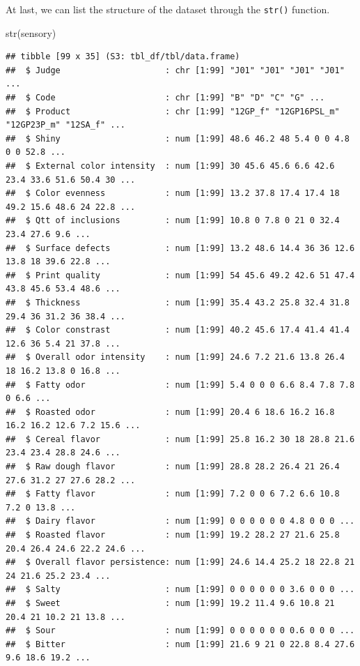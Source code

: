\documentclass[
]{book}
\newenvironment{Shaded}{\begin{snugshade}}{\end{snugshade}}
\newcommand{\FunctionTok}[1]{\textcolor[rgb]{0.00,0.00,0.00}{#1}}
\newcommand{\NormalTok}[1]{#1}
\begin{document}
At last, we can list the structure of the dataset through the \texttt{str()} function.

\begin{Shaded}
\begin{Highlighting}[]
\FunctionTok{str}\NormalTok{(sensory)}
\end{Highlighting}
\end{Shaded}

\begin{verbatim}
## tibble [99 x 35] (S3: tbl_df/tbl/data.frame)
##  $ Judge                     : chr [1:99] "J01" "J01" "J01" "J01" ...
##  $ Code                      : chr [1:99] "B" "D" "C" "G" ...
##  $ Product                   : chr [1:99] "12GP_f" "12GP16PSL_m" "12GP23P_m" "12SA_f" ...
##  $ Shiny                     : num [1:99] 48.6 46.2 48 5.4 0 0 4.8 0 0 52.8 ...
##  $ External color intensity  : num [1:99] 30 45.6 45.6 6.6 42.6 23.4 33.6 51.6 50.4 30 ...
##  $ Color evenness            : num [1:99] 13.2 37.8 17.4 17.4 18 49.2 15.6 48.6 24 22.8 ...
##  $ Qtt of inclusions         : num [1:99] 10.8 0 7.8 0 21 0 32.4 23.4 27.6 9.6 ...
##  $ Surface defects           : num [1:99] 13.2 48.6 14.4 36 36 12.6 13.8 18 39.6 22.8 ...
##  $ Print quality             : num [1:99] 54 45.6 49.2 42.6 51 47.4 43.8 45.6 53.4 48.6 ...
##  $ Thickness                 : num [1:99] 35.4 43.2 25.8 32.4 31.8 29.4 36 31.2 36 38.4 ...
##  $ Color constrast           : num [1:99] 40.2 45.6 17.4 41.4 41.4 12.6 36 5.4 21 37.8 ...
##  $ Overall odor intensity    : num [1:99] 24.6 7.2 21.6 13.8 26.4 18 16.2 13.8 0 16.8 ...
##  $ Fatty odor                : num [1:99] 5.4 0 0 0 6.6 8.4 7.8 7.8 0 6.6 ...
##  $ Roasted odor              : num [1:99] 20.4 6 18.6 16.2 16.8 16.2 16.2 12.6 7.2 15.6 ...
##  $ Cereal flavor             : num [1:99] 25.8 16.2 30 18 28.8 21.6 23.4 23.4 28.8 24.6 ...
##  $ Raw dough flavor          : num [1:99] 28.8 28.2 26.4 21 26.4 27.6 31.2 27 27.6 28.2 ...
##  $ Fatty flavor              : num [1:99] 7.2 0 0 6 7.2 6.6 10.8 7.2 0 13.8 ...
##  $ Dairy flavor              : num [1:99] 0 0 0 0 0 0 4.8 0 0 0 ...
##  $ Roasted flavor            : num [1:99] 19.2 28.2 27 21.6 25.8 20.4 26.4 24.6 22.2 24.6 ...
##  $ Overall flavor persistence: num [1:99] 24.6 14.4 25.2 18 22.8 21 24 21.6 25.2 23.4 ...
##  $ Salty                     : num [1:99] 0 0 0 0 0 0 3.6 0 0 0 ...
##  $ Sweet                     : num [1:99] 19.2 11.4 9.6 10.8 21 20.4 21 10.2 21 13.8 ...
##  $ Sour                      : num [1:99] 0 0 0 0 0 0 0.6 0 0 0 ...
##  $ Bitter                    : num [1:99] 21.6 9 21 0 22.8 8.4 27.6 9.6 18.6 19.2 ...

\end{verbatim}
\end{document}
